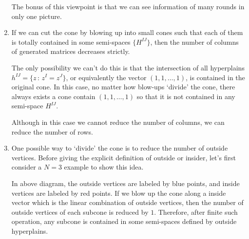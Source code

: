 \documentclass[12pt]{article}
\theoremstyle{definition}
\theoremstyle{plain}
\begin{document}
\begin{enumerate}
	
	The bonus of this viewpoint is that we can see information of many rounds 
	in only one picture.

	\item If we can cut the cone by blowing up into small cones such that 
	each of them is totally contained in some semi-spaces $\{H^{IJ}\}$, then
	the number of columns of generated matrices decreases strictly.

	The only possibility we can't do this is that 
	the intersection of all hyperplains $h^{IJ}=\{z\,:\, z^I=z^J\}$, 
	or equivalently the vector $(1,1,\dots,1)$, 
	is contained in the original cone.
	In this case, no matter how blow-ups `divide' the cone, 
	there always exists a cone contain
	$(1,1,\dots,1)$ so that it is not contained in any semi-space $H^{IJ}$.

	Although in this case we cannot reduce the number of columns, we can reduce the number of rows.

\item One possible way to `divide' the cone is to reduce the number of outside vertices.
	Before giving the explicit definition of outside or insider, let's first consider a $N=3$ 
	example to show this idea.
	\begin{center}
	\end{center}
In above diagram, the outside vertices are labeled by blue points, and inside vertices are
labeled by red points. If we blow up the cone along a inside vector which is 
the linear combination of outside vertices, then the number of outside
vertices of each subcone is reduced by $1$. Therefore, after finite such operation,
any subcone is contained in some semi-spaces defined by outside hyperplains.


\end{enumerate}
\end{document}
